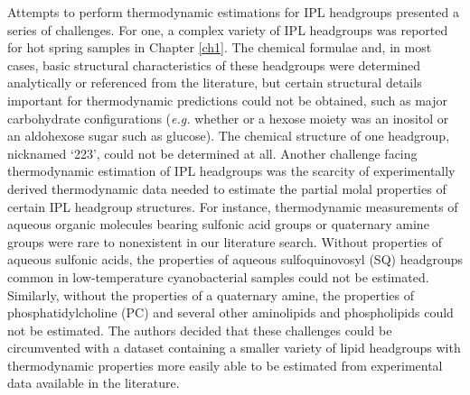 Attempts to perform thermodynamic estimations for IPL headgroups presented a series of challenges. For one, a complex variety of IPL headgroups was reported for hot spring samples in Chapter \ref{ch1}. The chemical formulae and, in most cases, basic structural characteristics of these headgroups were determined analytically or referenced from the literature, but certain structural details important for thermodynamic predictions could not be obtained, such as major carbohydrate configurations (\textit{e.g.} whether or a hexose moiety was an inositol or an aldohexose sugar such as glucose). The chemical structure of one headgroup, nicknamed `223', could not be determined at all. Another challenge facing thermodynamic estimation of IPL headgroups was the scarcity of experimentally derived thermodynamic data needed to estimate the partial molal properties of certain IPL headgroup structures. For instance, thermodynamic measurements of aqueous organic molecules bearing sulfonic acid groups or quaternary amine groups were rare to nonexistent in our literature search. Without properties of aqueous sulfonic acids, the properties of aqueous sulfoquinovosyl (SQ) headgroups common in low-temperature cyanobacterial samples could not be estimated. Similarly, without the properties of a quaternary amine, the properties of phosphatidylcholine (PC) and several other aminolipids and phospholipids could not be estimated. The authors decided that these challenges could be circumvented with a dataset containing a smaller variety of lipid headgroups with thermodynamic properties more easily able to be estimated from experimental data available in the literature.


